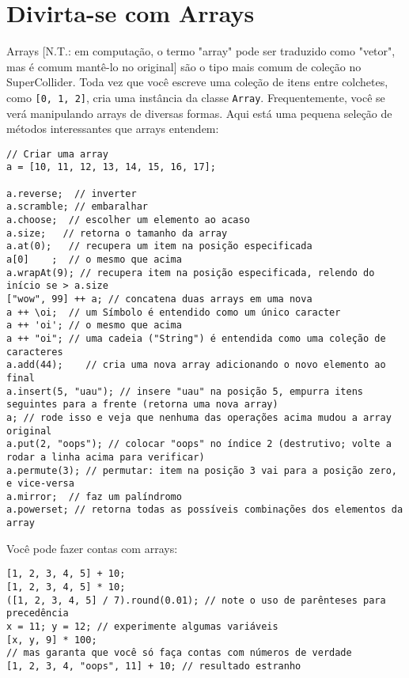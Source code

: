 \section{Divirta-se com Arrays}
\label{sec:arrays}

Arrays [N.T.: em computação, o termo "array" pode ser traduzido como "vetor", mas é comum mantê-lo no original] são o tipo mais comum de coleção no SuperCollider. Toda vez que você escreve uma coleção de itens entre colchetes, como \texttt{[0, 1, 2]}, cria uma instância da classe \texttt{Array}. Frequentemente, você se verá manipulando arrays de diversas formas. Aqui está uma pequena seleção de métodos interessantes que arrays entendem:

 
\begin{lstlisting}[style=SuperCollider-IDE, basicstyle=\scttfamily\footnotesize]
// Criar uma array
a = [10, 11, 12, 13, 14, 15, 16, 17];

a.reverse;  // inverter
a.scramble; // embaralhar
a.choose;  // escolher um elemento ao acaso
a.size;	  // retorna o tamanho da array
a.at(0);   // recupera um item na posição especificada
a[0]	;  // o mesmo que acima
a.wrapAt(9); // recupera item na posição especificada, relendo do início se > a.size
["wow", 99] ++ a; // concatena duas arrays em uma nova
a ++ \oi;  // um Símbolo é entendido como um único caracter
a ++ 'oi'; // o mesmo que acima
a ++ "oi"; // uma cadeia ("String") é entendida como uma coleção de caracteres
a.add(44);    // cria uma nova array adicionando o novo elemento ao final
a.insert(5, "uau"); // insere "uau" na posição 5, empurra itens seguintes para a frente (retorna uma nova array)
a; // rode isso e veja que nenhuma das operações acima mudou a array original
a.put(2, "oops"); // colocar "oops" no índice 2 (destrutivo; volte a rodar a linha acima para verificar)
a.permute(3); // permutar: item na posição 3 vai para a posição zero, e vice-versa
a.mirror;  // faz um palíndromo
a.powerset; // retorna todas as possíveis combinações dos elementos da array
\end{lstlisting}
 

Você pode fazer contas com arrays:

 
\begin{lstlisting}[style=SuperCollider-IDE, basicstyle=\scttfamily\footnotesize]
[1, 2, 3, 4, 5] + 10;
[1, 2, 3, 4, 5] * 10;
([1, 2, 3, 4, 5] / 7).round(0.01); // note o uso de parênteses para precedência
x = 11; y = 12; // experimente algumas variáveis
[x, y, 9] * 100;
// mas garanta que você só faça contas com números de verdade
[1, 2, 3, 4, "oops", 11] + 10; // resultado estranho
\end{lstlisting}
 

